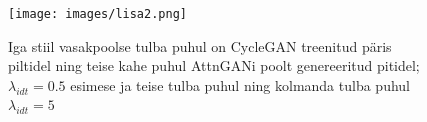 \documentclass{vilgym}
\begin{document}
	\begin{figure}[H]
		\texttt{[image: images/lisa2.png]}
		\caption{Iga stiil vasakpoolse tulba puhul on CycleGAN treenitud päris piltidel ning teise kahe puhul AttnGANi poolt genereeritud pitidel; $ \lambda_{idt} = 0.5 $ esimese ja teise tulba puhul ning kolmanda tulba puhul $ \lambda_{idt} = 5 $}
		\label{fig:lisa2}
	\end{figure}
\end{document}
